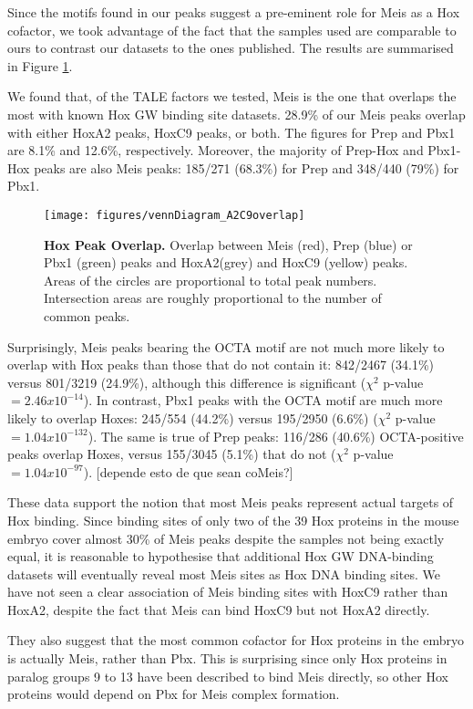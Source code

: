 Since the motifs found in our peaks suggest a pre-eminent role for Meis as a Hox cofactor, we took advantage of the fact that the samples used are comparable to ours to contrast our datasets to the ones published. The results are summarised in Figure \ref{fig:HoxOverlap}.

We found that, of the \ac{TALE} factors we tested, Meis is the one that overlaps the most with known Hox \ac{GW} binding site datasets. 28.9\% of our Meis peaks overlap with either HoxA2 peaks, HoxC9 peaks, or both. The figures for Prep and Pbx1 are 8.1\% and 12.6\%, respectively. Moreover, the majority of Prep-Hox and Pbx1-Hox peaks are also Meis peaks: 185/271 (68.3\%) for Prep and 348/440 (79\%) for Pbx1. 

\begin{figure}[]
  \centering
  \texttt{[image: figures/vennDiagram\_A2C9overlap]}
  \caption[Hox Peak Overlap]{\textbf{Hox Peak Overlap.} Overlap between Meis (red), Prep (blue) or Pbx1 (green) peaks and HoxA2(grey) and HoxC9 (yellow) peaks. Areas of the circles are proportional to total peak numbers. Intersection areas are roughly proportional to the number of common peaks.}
  \label{fig:HoxOverlap}
\end{figure}

Surprisingly, Meis peaks bearing the \ac{OCTA} motif are not much more likely to overlap with Hox peaks than those that do not contain it: 842/2467 (34.1\%) versus 801/3219 (24.9\%), although this difference is significant ($\chi^2$ p-value $= 2.46 x 10^{-14}$). In contrast, Pbx1 peaks with the \ac{OCTA} motif are much more likely to overlap Hoxes: 245/554 (44.2\%) versus 195/2950 (6.6\%) ($\chi^2$ p-value $= 1.04 x 10^{-132}$). The same is true of Prep peaks: 116/286 (40.6\%) \ac{OCTA}-positive peaks overlap Hoxes, versus 155/3045 (5.1\%) that do not ($\chi^2$ p-value $= 1.04 x 10^{-97}$).
[depende esto de que sean coMeis?]

These data support the notion that most Meis peaks represent actual targets of Hox binding. Since binding sites of only two of the 39 Hox proteins in the mouse embryo cover almost 30\% of Meis peaks despite the samples not being exactly equal, it is reasonable to hypothesise that additional Hox \ac{GW} DNA-binding datasets will eventually reveal most Meis sites as Hox DNA binding sites. We have not seen a clear association of Meis binding sites with HoxC9 rather than HoxA2, despite the fact that Meis can bind HoxC9 but not HoxA2 directly.

They also suggest that the most common cofactor for Hox proteins in the embryo is actually Meis, rather than Pbx. This is surprising since only Hox proteins in paralog groups 9 to 13 have been described to bind Meis directly, so other Hox proteins would depend on Pbx for Meis complex formation. 

